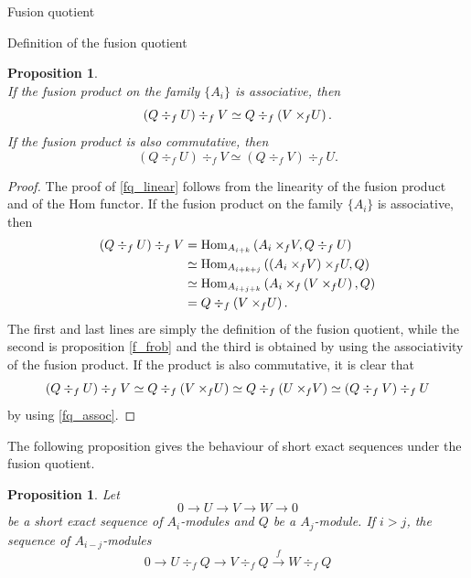 \documentclass[reqno]{amsart}
\newtheorem{Prop}[Thm]{Proposition}
\newcommand{\xf}{\times\hspace{-0.27em}_f}
\begin{document}
\begin{section}{Fusion quotient}
\begin{subsection}{Definition of the fusion quotient}
\begin{Prop}
\begin{equation}
\end{equation} 
If the fusion product on the family $\lbrace A_{i} \rbrace$ is associative, then
\begin{equation}\label{fq_assoc}
\left(Q \div_{f} U\right) \div_{f} V \simeq Q \div_{f} \left(V \xf U\right).
\end{equation}
If the fusion product is also commutative, then
\begin{equation}\label{fq_comm}
\left(Q \div_{f} U\right) \div_{f} V \simeq \left(Q \div_{f} V\right) \div_{f} U.
\end{equation}
\end{Prop}
\begin{proof}
The proof of \eqref{fq_linear} follows from the linearity of the fusion product and of the $\text{Hom}$ functor. If the fusion product on the family $\lbrace A_{i} \rbrace$ is associative, then
\begin{align}
\left(Q \div_{f} U\right) \div_{f} V & = \text{Hom}_{A_{i+k}}\left(A_{i}\xf V, Q \div_{f}U\right) \\
& \simeq \text{Hom}_{A_{i+k+j}}\left(\left(A_{i}\xf V\right)\xf U, Q \right)\\
& \simeq \text{Hom}_{A_{i+j+k}}\left(A_{i}\xf \left(V\xf U \right),Q\right)\\
& = Q \div_{f} \left(V \xf U \right).
\end{align}
The first and last lines are simply the definition of the fusion quotient, while the second is proposition \ref{f_frob} and the third is obtained by using the associativity of the fusion product. If the product is also commutative, it is clear that
\begin{equation}
\left(Q \div_{f} U\right) \div_{f} V  \simeq Q \div_{f} \left(V \xf U\right) \simeq Q \div_{f} \left(U \xf V\right) \simeq  \left(Q \div_{f} V\right) \div_{f} U 
\end{equation}
by using \eqref{fq_assoc}.
\end{proof}
The following proposition gives the behaviour of short exact sequences under the fusion quotient.
\begin{Prop}\label{prop:fusionq.functor}
Let $$0 \longrightarrow U \longrightarrow V \longrightarrow W \longrightarrow 0 $$ be a short exact sequence of $A_{i}$-modules and $Q$ be a $A_{j}$-module. If $i>j$, the sequence of $A_{i-j}$-modules
\begin{equation}
0 \longrightarrow U \div_{f} Q \longrightarrow V\div_{f} Q \overset{f}{\longrightarrow} W \div_{f} Q
\end{equation}

\end{Prop}
\end{subsection}
\end{section}
\end{document}

